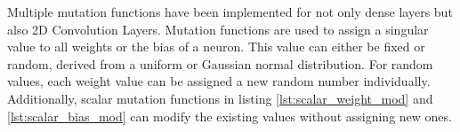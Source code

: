 Multiple mutation functions have been implemented for not only dense layers but also 2D Convolution Layers.
Mutation functions are used to assign a singular value to all weights or the bias of a neuron.
This value can either be fixed or random, derived from a uniform or Gaussian normal distribution.
For random values, each weight value can be assigned a new random number individually.
Additionally, scalar mutation functions in listing \ref{lst:scalar_weight_mod} and \ref{lst:scalar_bias_mod} can modify the existing values without assigning new ones.


